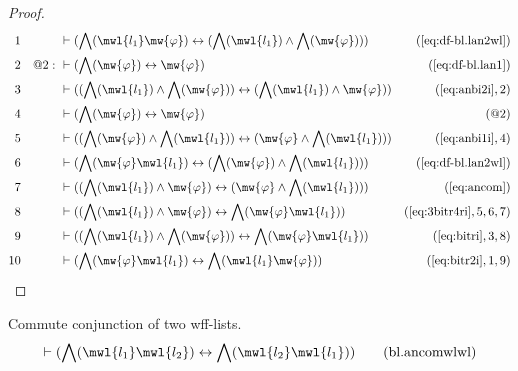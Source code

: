 \begin{proof}
\begin{align}
  1 &&  & \vdash ( \bigwedge( \mwl{l_1} \mw{\varphi} ) \leftrightarrow (
     \bigwedge( \mwl{l_1} ) \wedge \bigwedge( \mw{\varphi}
     ) ) )&(\mbox{\ref{eq:df-bl.lan2wl}})\notag
  \\ 2 && @2:\  & \vdash ( \bigwedge( \mw{\varphi} ) \leftrightarrow
     \mw{\varphi} )&(\mbox{\ref{eq:df-bl.lan1}})\notag
  \\ 3 &&  & \vdash ( ( \bigwedge( \mwl{l_1} ) \wedge \bigwedge( \mw{\varphi} )
     ) \leftrightarrow ( \bigwedge( \mwl{l_1} ) \wedge
     \mw{\varphi} ) )&(\mbox{\ref{eq:anbi2i}},2)\notag
  \\ 4 &&  & \vdash ( \bigwedge( \mw{\varphi} ) \leftrightarrow \mw{\varphi}
     )&(@2)\notag
  \\ 5 &&  & \vdash ( ( \bigwedge( \mw{\varphi} ) \wedge \bigwedge( \mwl{l_1} )
     ) \leftrightarrow ( \mw{\varphi} \wedge \bigwedge(
     \mwl{l_1} ) ) )&(\mbox{\ref{eq:anbi1i}},4)\notag
  \\ 6 &&  & \vdash ( \bigwedge( \mw{\varphi} \mwl{l_1} ) \leftrightarrow (
     \bigwedge( \mw{\varphi} ) \wedge \bigwedge( \mwl{l_1}
     ) ) )&(\mbox{\ref{eq:df-bl.lan2wl}})\notag
  \\ 7 &&  & \vdash ( ( \bigwedge( \mwl{l_1} ) \wedge \mw{\varphi} )
     \leftrightarrow ( \mw{\varphi} \wedge \bigwedge(
     \mwl{l_1} ) ) )&(\mbox{\ref{eq:ancom}})\notag
  \\ 8 &&  & \vdash ( ( \bigwedge( \mwl{l_1} ) \wedge \mw{\varphi} )
     \leftrightarrow \bigwedge( \mw{\varphi} \mwl{l_1} )
     )&(\mbox{\ref{eq:3bitr4ri}},5,6,7)\notag
  \\ 9 &&  & \vdash ( ( \bigwedge( \mwl{l_1} ) \wedge \bigwedge( \mw{\varphi} )
     ) \leftrightarrow \bigwedge( \mw{\varphi} \mwl{l_1} )
     )&(\mbox{\ref{eq:bitri}},3,8)\notag
  \\ 10 &&  & \vdash ( \bigwedge( \mw{\varphi} \mwl{l_1} ) \leftrightarrow
     \bigwedge( \mwl{l_1} \mw{\varphi} )
     )&(\mbox{\ref{eq:bitr2i}},1,9)\notag
\end{align}
\end{proof}

\begin{lemma} {Commute conjunction of two wff-lists.}
\begin{align}
\vdash ( \bigwedge( \mwl{l_1} \mwl{l_2} ) \leftrightarrow \bigwedge( \mwl{l_2}
    \mwl{l_1} ) )\label{eq:bl.ancomwlwl}\tag{bl.ancomwlwl}
\end{align}
\end{lemma}


